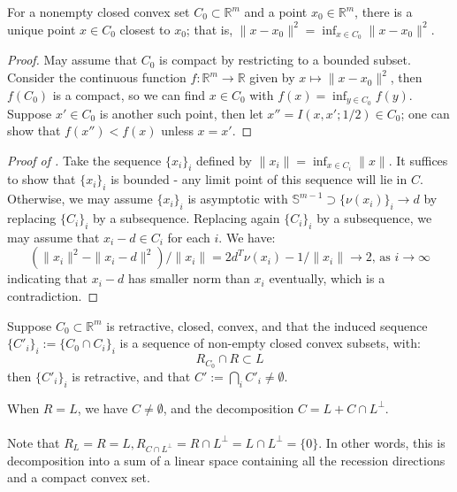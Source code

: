 \begin{lemm}\label{lemm:013-projection}
	For a nonempty closed convex set $C_0\subset \mathbb{R}^m$ and a point $x_0\in \mathbb{R}^m$, there is a unique point $x\in C_0$ closest to $x_0$; that is, $\|x-x_0\|^2=\inf_{x\in C_0}\|x-x_0\|^2$.
\end{lemm}

\begin{proof}
	May assume that $C_0$ is compact by restricting to a bounded subset. Consider the continuous function $f:\mathbb{R}^m\to \mathbb{R}$ given by $x\mapsto \|x-x_0\|^2$, then $f(C_0)$ is a compact, so we can find $x\in C_0$ with $f(x)=\inf_{y\in C_0}f(y)$. Suppose $x'\in C_0$ is another such point, then let $x''=I(x,x';1/2)\in C_0$; one can show that $f(x'')< f(x)$ unless $x=x'$.
\end{proof}

\begin{proof}[Proof of ]
	Take the sequence $\{x_i\}_i$ defined by $\|x_i\|=\inf_{x\in C_i}\|x\|$. It suffices to show that $\{x_i\}_i$ is bounded - any limit point of this sequence will lie in $C$. Otherwise, we may assume $\{x_i\}_i$ is asymptotic with $\mathbb{S}^{m-1}\supset\{\nu(x_i)\}_i\to d$ by replacing $\{C_i\}_i$ by a subsequence. Replacing again $\{C_i\}_i$ by a subsequence, we may assume that $x_i-d\in C_i$ for each $i$. We have:
	\[
		\left(\|x_i\|^2-\|x_i-d\|^2\right)/\|x_i\|=2d^T\nu(x_i)-1/\|x_i\|\to 2\text{, as }i\to\infty
	\]
	indicating that $x_i-d$ has smaller norm than $x_i$ eventually, which is a contradiction.
\end{proof}

\begin{prop}\label{prop:013-non-empt-II}
	Suppose $C_0\subset \mathbb{R}^m$ is retractive, closed, convex, and that the induced sequence $\{C'_i\}_i:=\{C_0\cap C_i\}_i$ is a sequence of non-empty closed convex subsets, with:
	\[
		R_{C_0}\cap R\subset L
	\]
	then $\{C'_i\}_i$ is retractive, and that $C':=\bigcap_iC'_i\neq\emptyset$.
\end{prop}

\begin{coro}\label{coro:013-decomp-compact}
	When $R=L$, we have $C\neq\emptyset$, and the decomposition $C=L+C\cap L^\perp$.
\end{coro}

\paragraph{}Note that $R_L=R=L,R_{C\cap L^{\perp}}=R\cap L^\perp=L\cap L^\perp=\{0\}$. In other words, this is decomposition into a sum of a linear space containing all the recession directions and a compact convex set.

